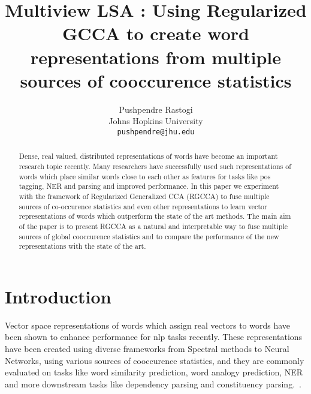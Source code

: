\documentclass[11pt]{article}
\title{Multiview LSA : Using Regularized GCCA to create word
  representations from multiple sources of cooccurence statistics}
\author{Pushpendre Rastogi \\
  Johns Hopkins University \\
  {\tt pushpendre@jhu.edu} 
}
\date{}
\begin{document}
\maketitle
\begin{abstract}
  Dense, real valued, distributed representations of words have become an
  important research topic recently. Many researchers have
  successfully used such representations of words which place similar words close
  to each other as features for tasks like pos tagging, NER and 
  parsing and improved performance. In this paper we experiment with
  the framework of Regularized Generalized CCA (RGCCA) to fuse multiple
  sources of co-occurence statistics and even other representations to
  learn vector representations of words which outperform the state of the art
   methods.
  The main aim of the paper is to present RGCCA as a
  natural and interpretable way to fuse multiple sources of global
  cooccurence statistics and to compare the performance of the new
  representations with the state of the art.
\end{abstract}

\section{Introduction}
Vector space representations of words which assign
 real vectors to words have been shown to enhance performance for nlp
 tasks recently. These representations have been created using diverse
 frameworks from Spectral methods to Neural Networks, using various sources of
 cooccurence statistics, and they are commonly evaluated on tasks
 like word similarity prediction, word analogy prediction,
 NER and more downstream tasks like dependency parsing and
 constituency parsing.~\cite{dhillon2011multi,dhillon2012two,mikolov2013efficient,mikolov2013distributed,collobert2013word,zou2013bilingual,faruqui2014improving,pennington2014glove,bansal2014tailoring,levy2014dependency}.
\end{document}
